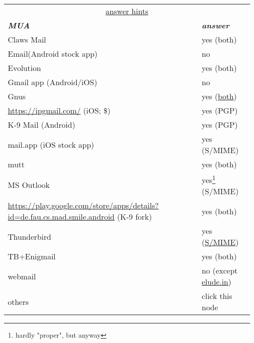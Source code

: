 \documentclass[12pt]{scrartcl}
\begin{document}
\begin{preview}
  \fontsize{4mm}{4mm}\selectfont 
  \begin{minipage}{6cm} %
    \begin{tabular}{lp{26mm}}
      \multicolumn{2}{|c|}{\underline{answer hints}}\\
      \textsl{\textbf{MUA}}          & \textsl{\textbf{answer}}\\
      Claws Mail                     & yes (both)\\
      Email\tiny(Android stock app)  & no\\
      Evolution                      & yes (both)\\
      Gmail app \tiny(Android/iOS)   & no\\
      Gnus                           & yes (\href{https://www.emacswiki.org/emacs/GnusSMIME}{both})\\
      \href{iPGMail}{https://ipgmail.com/} (iOS; \$) & yes (PGP)\\
      K-9 Mail \tiny(Android)        & yes (PGP)\\
      mail.app \tiny(iOS stock app)  & yes (S/MIME)\\
      mutt                           & yes (both)\\
      MS Outlook                     & yes\footnote[$\star$]{hardly "proper", but anyway} (S/MIME)\\
      \href{SMile}{https://play.google.com/store/apps/details?id=de.fau.cs.mad.smile.android} \tiny(K-9 fork) & yes (both)\\
      Thunderbird                    & yes (\href{http://kb.mozillazine.org/Installing_an_SMIME_certificate}{S/MIME})\\
      TB+Enigmail                    & yes (both)\\
      webmail                        & no \tiny(except \href{eludemaillhqfkh5.onion}{elude.in})\\
      others                         & click this node\\
    \end{tabular}
  \end{minipage}
\end{preview}
\end{document}
